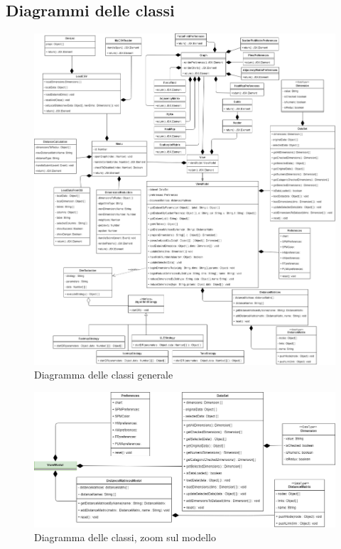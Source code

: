\subsection{Diagrammi delle classi}
\begin{figure}[hb]
\includegraphics[width=14.7cm]{Images/Allegato Tecnico-Class}
\centering
\caption{Diagramma delle classi generale}
\end{figure}

\begin{landscape}
\vspace*{\fill}
\begin{figure}[hb]
\includegraphics[width=\linewidth]{Images/Allegato Tecnico-Model}
\centering
\caption{Diagramma delle classi, zoom sul modello}
\end{figure}
\vfill
\end{landscape}

